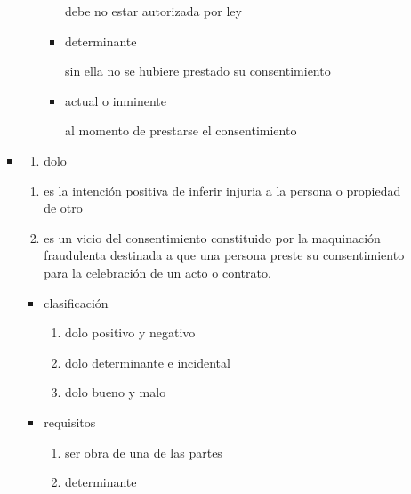 \documentclass[]{article}
\providecommand{\tightlist}{%
  \setlength{\itemsep}{0pt}\setlength{\parskip}{0pt}}
\begin{document}
\begin{itemize}
\begin{itemize}
\begin{itemize}
\begin{itemize}
\begin{itemize}
          debe no estar autorizada por ley
        \item
          determinante

          sin ella no se hubiere prestado su consentimiento
        \item
          actual o inminente

          al momento de prestarse el consentimiento
        \end{itemize}
      \end{itemize}
    \item
      \begin{enumerate}
      \def\labelenumi{\alph{enumi})}
      \setcounter{enumi}{2}
      \tightlist
      \item
        dolo
      \end{enumerate}

      \begin{enumerate}
      \def\labelenumi{\arabic{enumi}.}
      \tightlist
      \item
        es la intención positiva de inferir injuria a la persona o
        propiedad de otro
      \item
        es un vicio del consentimiento constituido por la maquinación
        fraudulenta destinada a que una persona preste su consentimiento
        para la celebración de un acto o contrato.
      \end{enumerate}

      \begin{itemize}
      \tightlist
      \item
        clasificación

        \begin{enumerate}
        \def\labelenumi{\arabic{enumi}.}
        \tightlist
        \item
          dolo positivo y negativo
        \item
          dolo determinante e incidental
        \item
          dolo bueno y malo
        \end{enumerate}
      \item
        requisitos

        \begin{enumerate}
        \def\labelenumi{\arabic{enumi}.}
        \tightlist
        \item
          ser obra de una de las partes
        \item
          determinante
        \end{enumerate}
      \end{itemize}


\end{itemize}
\end{itemize}
\end{itemize}
\end{document}
